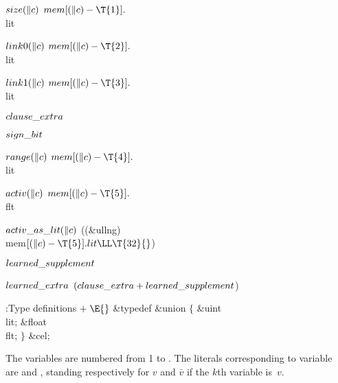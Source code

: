 \Y\B\4\D$\\{size}(\|c)$ \5
$\\{mem}[(\|c)-\T{1}].{}$\\{lit}\par
\B\4\D$\\{link0}(\|c)$ \5
$\\{mem}[(\|c)-\T{2}].{}$\\{lit}\par
\B\4\D$\\{link1}(\|c)$ \5
$\\{mem}[(\|c)-\T{3}].{}$\\{lit}\par
\B\4\D$\\{clause\_extra}$ \5
\par
\B\4\D$\\{sign\_bit}$ \5
\par
\B\4\D$\\{range}(\|c)$ \5
$\\{mem}[(\|c)-\T{4}].{}$\\{lit}\par
\B\4\D$\\{activ}(\|c)$ \5
$\\{mem}[(\|c)-\T{5}].{}$\\{flt}\par
\B\4\D$\\{activ\_as\_lit}(\|c)$ \5
((\&{ullng}) \\{mem}${}[(\|c)-\T{5}].\\{lit}\LL\T{32}{}$)\par
\B\4\D$\\{learned\_supplement}$ \5
\par
\B\4\D$\\{learned\_extra}$ \5
$(\\{clause\_extra}+\\{learned\_supplement}{}$)\par
\Y\B\4:Type definitions\X${}\mathrel+\E{}$\6
\&{typedef} \&{union} ${}\{{}$\1\6
\&{uint} \\{lit};\6
\&{float} \\{flt};\2\6
${}\}{}$ \&{cel};\par
\fi

The variables are numbered from 1 to . The literals
corresponding
to variable~ are  and , standing
respectively for $v$
and $\bar v$ if the $k$th variable is~$v$.

